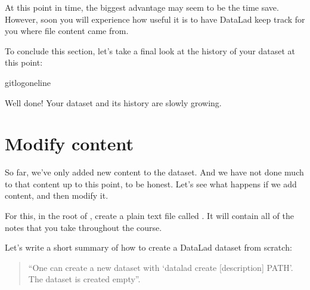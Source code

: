 \sphinxAtStartPar
At this point in time, the biggest advantage may seem to be the time save. However,
soon you will experience how useful it is to have DataLad keep track for you where
file content came from.

\sphinxAtStartPar
To conclude this section, let’s take a final look at the history of your dataset at
this point:

\begin{sphinxVerbatim}[commandchars=\\\{\}]
gitlog\PYGZhy{}\PYGZhy{}oneline
\end{sphinxVerbatim}

\sphinxAtStartPar
Well done! Your  dataset and its history are slowly growing.

\sphinxstepscope


\section{Modify content}
\label{\detokenize{basics/101-103-modify:modify-content}}\label{\detokenize{basics/101-103-modify:modify}}\label{\detokenize{basics/101-103-modify::doc}}
\sphinxAtStartPar
So far, we’ve only added new content to the dataset. And we have not done
much to that content up to this point, to be honest. Let’s see what happens if
we add content, and then modify it.

\sphinxAtStartPar
For this, in the root of , create a plain text file
called . It will contain all of the notes that you take
throughout the course.

\sphinxAtStartPar
Let’s write a short summary of how to create a DataLad dataset from scratch:
\begin{quote}

\sphinxAtStartPar
“One can create a new dataset with ‘datalad create
{[}\textendash{}description{]} PATH’. The dataset is created empty”.
\end{quote}

